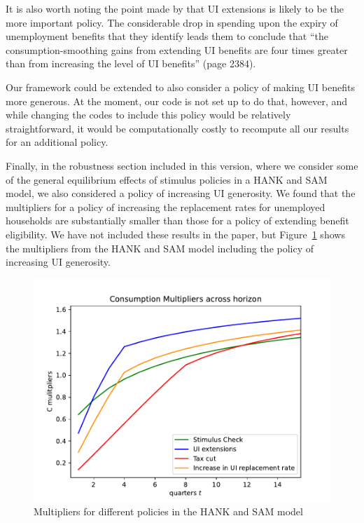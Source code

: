 \documentclass[12pt,letterpaper,english]{article}
\begin{document}
\begin{enumerate}
\begin{enumerate}
		It is also worth noting the point made by \citet{ganongConsumer2019} that UI extensions is likely to be the more important policy. The considerable drop in spending upon the expiry of unemployment benefits that they identify leads them to conclude that ``the consumption-smoothing gains from extending UI benefits are four times greater than from increasing the level of UI benefits'' (page 2384).
		
		Our framework could be extended to also consider a policy of making UI benefits more generous. At the moment, our code is not set up to do that, however, and while changing the codes to include this policy would be relatively straightforward, it would be computationally costly to recompute all our results for an additional policy. 

		Finally, in the robustness section included in this version, where we consider some of the general equilibrium effects of stimulus policies in a HANK and SAM model, we also considered a policy of increasing UI generosity. We found that the multipliers for a policy of increasing the replacement rates for unemployed households are substantially smaller than those for a policy of extending benefit eligibility. We have not included these results in the paper, but Figure~\ref{fig:multHANKSAM} shows the multipliers from the HANK and SAM model including the policy of increasing UI generosity.
		
		\begin{figure}
			\begin{center}
				\includegraphics[width=.65\textwidth]{../../../../Code/HA-Models/FromPandemicCode/Figures/HANK_Figures/HANK_multipliers_w_splurge_and_generosity}
				\caption{Multipliers for different policies in the HANK and SAM model}
				\label{fig:multHANKSAM}
			\end{center}			
		\end{figure}
	

\end{enumerate}
\end{enumerate}
\end{document}
